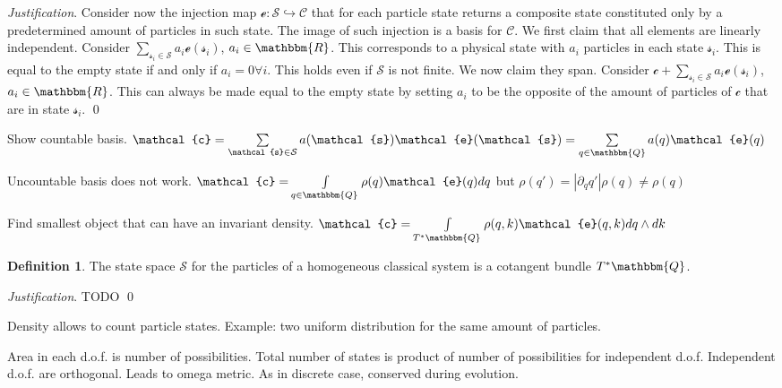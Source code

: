 \documentclass[aps,pra,10pt,twocolumn,floatfix,nofootinbib]{revtex4-1}
\theoremstyle{definition}
\newtheorem{defn}[prop]{Definition}
\newenvironment{justification}{\emph{Justification}.}{\qed}
\begin{document}
\begin{justification}
Consider now the injection map $\mathcal{e}: \mathcal{S} \hookrightarrow \mathcal{C}$ that for each particle state returns a composite state constituted only by a predetermined amount of particles in such state. The image of such injection is a basis for $\mathcal{C}$. We first claim that all elements are linearly independent. Consider $\sum\limits_{\mathcal{s}_i \in \mathcal{S}} a_i \mathcal{e}(\mathcal{s}_i)$, $a_i \in \mathbbm{R}$. This corresponds to a physical state with $a_i$ particles in each state $\mathcal{s}_i$. This is equal to the empty state if and only if $a_i=0 \forall i$. This holds even if $\mathcal{S}$ is not finite. We now claim they span. Consider $\mathcal{c} + \sum\limits_{\mathcal{s}_i \in \mathcal{S}} a_i \mathcal{e}(\mathcal{s}_i)$, $a_i \in \mathbbm{R}$. This can always be made equal to the empty state by setting $a_i$ to be the opposite of the amount of particles of $\mathcal{c}$ that are in state $\mathcal{s}_i$.
\end{justification}

Show countable basis. $\mathcal{c}= \sum\limits_{\mathcal{s} \in \mathcal{S}} a(\mathcal{s}) \mathcal{e}(\mathcal{s})=\sum\limits_{q \in \mathbbm{Q}} a(q) \mathcal{e}(q)$


Uncountable basis does not work. $\mathcal{c}= \int\limits_{q \in \mathbbm{Q}} \rho(q) \mathcal{e}(q)dq$ but $\rho(q')=|\partial _{q}q'|\rho(q)\neq\rho(q)$


Find smallest object that can have an invariant density. $\mathcal{c}= \int\limits_{T^*\mathbbm{Q}} \rho(q,k) \mathcal{e}(q,k)dq\wedge dk$

\begin{defn}\label{classical_phase_space}
The state space $\mathcal{S}$ for the particles of a homogeneous classical  system is a cotangent bundle $T^*\mathbbm{Q}$.
\end{defn}

\begin{justification}
	TODO
\end{justification}

Density allows to count particle states. Example: two uniform distribution for the same amount of particles.

Area in each d.o.f. is number of possibilities. Total number of states is product of number of possibilities for independent d.o.f. Independent d.o.f. are orthogonal. Leads to omega metric. As in discrete case, conserved during evolution.
\end{document}
